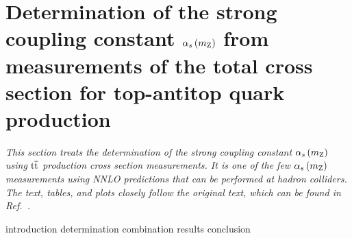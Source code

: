 \section{Determination of the strong coupling constant \texorpdfstring{$\alpha_s \left( m_\mathrm{Z} \right) $}{alpha_s(mZ)} from measurements of the total cross section for top-antitop quark production}

\emph{%
This section treats the determination of the strong coupling constant $\alpha_s \left( m_\mathrm{Z} \right) $ using $\mathrm{t}\overline{\mathrm{t}}$ production cross section measurements.
% 
It is one of the few $\alpha_s \left( m_\mathrm{Z} \right) $ measurements using NNLO predictions that can be performed at hadron colliders.
% 
The text, tables, and plots closely follow the original text, which can be found in Ref.~\cite{Klijnsma:2017eqp}.
}

{introduction}
{determination}
{combination}
{results}
{conclusion}

